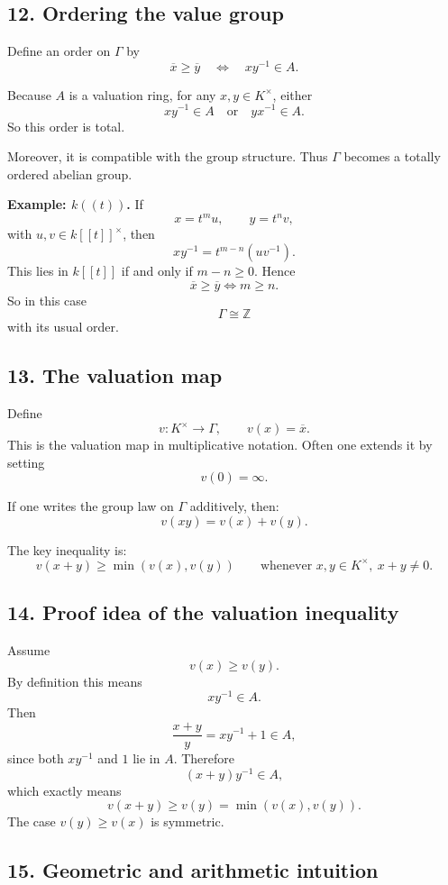 \documentclass[12pt,a4paper]{article}
\theoremstyle{notespace}
\begin{document}
\subsection{12. Ordering the value group}

Define an order on \(\Gamma\) by
\[
\overline{x} \ge \overline{y}
\quad \Longleftrightarrow \quad
xy^{-1}\in A.
\]

Because \(A\) is a valuation ring, for any \(x,y\in K^\times\), either
\[
xy^{-1}\in A
\quad \text{or} \quad
yx^{-1}\in A.
\]
So this order is total.

Moreover, it is compatible with the group structure. Thus \(\Gamma\) becomes a totally ordered abelian group.

\textbf{Example: \(k((t))\).}
If
\[
x=t^m u,
\qquad
y=t^n v,
\]
with \(u,v\in k[[t]]^\times\), then
\[
xy^{-1}=t^{m-n}(uv^{-1}).
\]
This lies in \(k[[t]]\) if and only if \(m-n\ge 0\). Hence
\[
\overline{x}\ge \overline{y}
\iff m\ge n.
\]
So in this case
\[
\Gamma \cong \mathbb Z
\]
with its usual order.

\subsection{13. The valuation map}

Define
\[
v:K^\times \to \Gamma,
\qquad
v(x)=\overline{x}.
\]
This is the valuation map in multiplicative notation. Often one extends it by setting
\[
v(0)=\infty.
\]

If one writes the group law on \(\Gamma\) additively, then:
\[
v(xy)=v(x)+v(y).
\]

The key inequality is:
\[
v(x+y)\ge \min(v(x),v(y))
\qquad \text{whenever } x,y\in K^\times,\ x+y\neq 0.
\]

\subsection{14. Proof idea of the valuation inequality}

Assume
\[
v(x)\ge v(y).
\]
By definition this means
\[
xy^{-1}\in A.
\]
Then
\[
\frac{x+y}{y}=xy^{-1}+1\in A,
\]
since both \(xy^{-1}\) and \(1\) lie in \(A\). Therefore
\[
(x+y)y^{-1}\in A,
\]
which exactly means
\[
v(x+y)\ge v(y)=\min(v(x),v(y)).
\]
The case \(v(y)\ge v(x)\) is symmetric.

\subsection{15. Geometric and arithmetic intuition}
\end{document}
